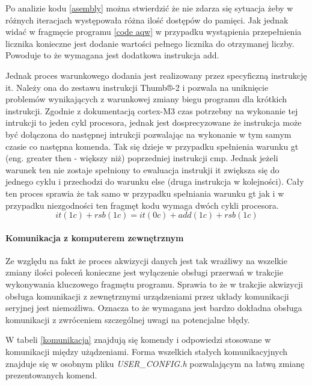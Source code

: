 \documentclass[a4paper,12pt]{article}
\begin{document}
Po analizie kodu \ref{asembly} można stwierdzić że nie zdarza się sytuacja żeby w różnych iteracjach występowała różna ilość dostępów do pamięci.
Jak jednak widać w fragmęcie programu \ref{code aqw} w przypadku wystąpienia przepełnienia licznika konieczne jest dodanie wartości pełnego licznika do otrzymanej liczby. 
Powoduje to że wymagana jest dodatkowa instrukcja add.

Jednak proces warunkowego dodania jest realizowany przez specyficzną instrukcję it.
Należy ona do zestawu instrukcji Thumb®-2 i pozwala na uniknięcie problemów wynikających z warunkowej zmiany biegu programu dla krótkich instrukcji. 
Zgodnie z dokumentacją\cite{cycles} cortex-M3 czas potrzebny na wykonanie tej intrukcji to jeden cykl procesora, jednak jest dosprecyzowane że instrukcja może być dołączona do następnej intrukcji pozwalając na wykonanie w tym samym czasie co następna komenda.
Tak się dzieje w przypadku spełnienia warunku gt (eng. greater then - większy niż) poprzedniej instrukcji cmp. Jednak jeżeli warunek ten nie zostaje spełniony to ewaluacja instrukji it zwiększa się do jednego cyklu i przechodzi do warunku else (druga instrukcja w kolejności).
Cały ten proces sprawia że tak samo w przypadku spełniania warunku gt jak i w przypadku niezgodności ten fragmęt kodu wymaga dwóch cykli procesora.
$$it(1c) + rsb(1c) = it(0c) + add(1c) + rsb(1c)$$

\paragraph{Komunikacja z komputerem zewnętrznym}
Ze względu na fakt że proces akwizycji danych jest tak wrażliwy na wszelkie zmiany ilości poleceń konieczne jest wyłączenie obsługi przerwań w trakcjie wykonywania kluczowego fragmętu programu. 
Sprawia to że w trakcjie akwizycji obsługa komunikacji z zewnętrznymi urządzeniami przez układy komunikacji seryjnej jest niemożliwa. 
Oznacza to że wymagana jest bardzo dokładna obsługa komunikacji z zwróceniem szczególnej uwagi na potencjalne błędy. 

W tabeli \ref{komunikacja} znajdują się komendy i odpowiedzi stosowane w komunikacji między użądzeniami. 
Forma wszelkich stałych komunikacyjnych znajduje się w osobnym pliku \textit{USER\_CONFIG.h} pozwalającym na łatwą zmianę prezentowanych komend.
\end{document}
